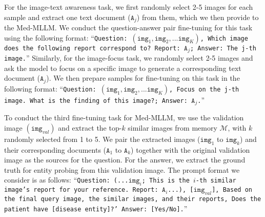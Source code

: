 For the image-text awareness task, we first randomly select 2-5 images for each sample and extract one text document ($\texttt{A}_{j}$) from them, which we then provide to the Med-MLLM. We conduct the question-answer pair fine-tuning for this task using the following format:
``\texttt{Question: $(\texttt{img}_{1}, \texttt{img}_{2}, ... \texttt{img}_{K})$,  Which image does the following report correspond to? Report: $\texttt{A}_{j}$; Answer: The j-th image.}''
Similarly, for the image-focus task, we randomly select 2-5 images and ask the model to focus on a specific image to generate a corresponding text document ($\texttt{A}_{j}$). We then prepare samples for fine-tuning on this task in the following format:
``\texttt{Question: $(\texttt{img}_{1}, \texttt{img}_{2}, ... \texttt{img}_{K})$, Focus on the j-th image. What is the finding of this image?; Answer: $\texttt{A}_{j}$.}''

To conduct the third fine-tuning task for Med-MLLM, we use the validation image $(\texttt{img}_{val})$ and extract the top-$k$ similar images from memory $\mathcal{M}$, with $k$ randomly selected from 1 to 5. We pair the extracted images ($\texttt{img}_{1}$ to $\texttt{img}_{k}$) and their corresponding documents ($\texttt{A}_{1}$ to $\texttt{A}_{k}$) together with the original validation image as the sources for the question. For the answer, we extract the ground truth for entity probing from this validation image. The prompt format we consider is as follows:
``\texttt{Question: (...$\texttt{img}_{i}$; This is the $i$-th similar image's report for your reference. Report: $\texttt{A}_{i}$...), [$\texttt{img}_{val}$], Based on the final query image, the similar images, and their reports, Does the patient have [disease entity]?' Answer: [Yes/No].}''

